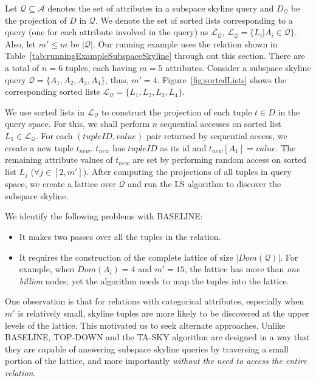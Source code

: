 \begin{exmp}\label{exmp:subspaceSkyline}
Let $\mathcal{Q} \subseteq \mathcal{A}$ denotes the set of attributes in a subspace skyline query and $D_{\mathcal{Q}}$ be the projection of $D$ in $\mathcal{Q}$. We denote the set of sorted lists corresponding to a query (one for each attribute involved in the query) as $\mathcal{L_Q}$, $\mathcal{L_Q} = \{ L_i | A_i \in \mathcal{Q} \}$. Also, let $m' \leq m$ be $|\mathcal{Q}|$. Our running example uses the relation shown in Table~\ref{tab:runningExampleSubspaceSkyline} through out this section. There are a
total of  $n=6$ tuples, each having $m=5$ attributes. Consider a subspace skyline query $\mathcal{Q} = \{A_1, A_2, A_3, A_4\}$, thus, $m' = 4$. Figure~\ref{fig:sortedLists} shows the corresponding sorted lists $\mathcal{L_Q} = \{L_1, L_2, L_3, L_4 \}$.
\end{exmp}

\vspace{1mm}
 We use sorted lists in $\mathcal{L_Q}$ to construct the projection of each tuple $t \in D$ in the query space. For this, we shall perform $n$ sequential accesses on sorted list $L_1 \in \mathcal{L_Q}$. For each $(tupleID, value)$ pair returned by sequential access, we create a new tuple $t_{new}$. $t_{new}$ has $tupleID$ as its id and $t_{new}[A_1] = value$. The remaining attribute values of $t_{new}$ are set by performing random access on sorted list $L_j$ ($\forall j \in [2,m']$). After computing the projections of all tuples in query space, we create a lattice over $\mathcal{Q}$ and 
run the LS algorithm to discover the subspace skyline.

\vspace{3mm}
\noindent We identify the following problems with BASELINE:
\begin{itemize}
\itemsep0em
\item It makes two passes over all the tuples in the relation.
\item It requires the construction of the complete lattice of size $|Dom(\mathcal{Q})|$. For example, when $Dom(A_i) = 4$ and $m'=15$, the lattice has more than {\em one billion} nodes; yet the algorithm needs to map the tuples into the lattice.
\end{itemize}

One observation is that for relations with categorical attributes, especially when $m'$ is relatively small, skyline tuples are more likely to be discovered at the upper levels of the lattice. This motivated us to seek alternate approaches.
Unlike BASELINE, TOP-DOWN and the TA-SKY algorithm are designed in a way that they are capable of answering subspace skyline queries by traversing a small portion of the lattice, and more importantly {\em without the need to access the entire relation}.

